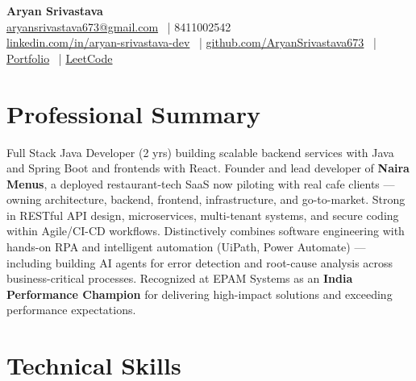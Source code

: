 \documentclass[10pt]{article}
\begin{document}
\textbf{\Large Aryan Srivastava} \\
\href{mailto:aryansrivastava673@gmail.com}{aryansrivastava673@gmail.com} \ | 8411002542 \\
\href{https://www.linkedin.com/in/aryan-srivastava-dev/}{linkedin.com/in/aryan-srivastava-dev} \ |
\href{https://github.com/AryanSrivastava673}{github.com/AryanSrivastava673} \ |
\href{https://aryansrivastava673.github.io/dev_portfolio/}{Portfolio} \ |
\href{https://leetcode.com/u/aryansrivastava673/}{LeetCode}

\section*{Professional Summary}

Full Stack Java Developer (2 yrs) building scalable backend services with Java and Spring Boot and frontends with React. Founder and lead developer of \textbf{Naira Menus}, a deployed restaurant-tech SaaS now piloting with real cafe clients — owning architecture, backend, frontend, infrastructure, and go-to-market. Strong in RESTful API design, microservices, multi-tenant systems, and secure coding within Agile/CI-CD workflows. Distinctively combines software engineering with hands-on RPA and intelligent automation (UiPath, Power Automate) — including building AI agents for error detection and root-cause analysis across business-critical processes. Recognized at EPAM Systems as an \textbf{India Performance Champion} for delivering high-impact solutions and exceeding performance expectations.

\section*{Technical Skills}
\end{document}
